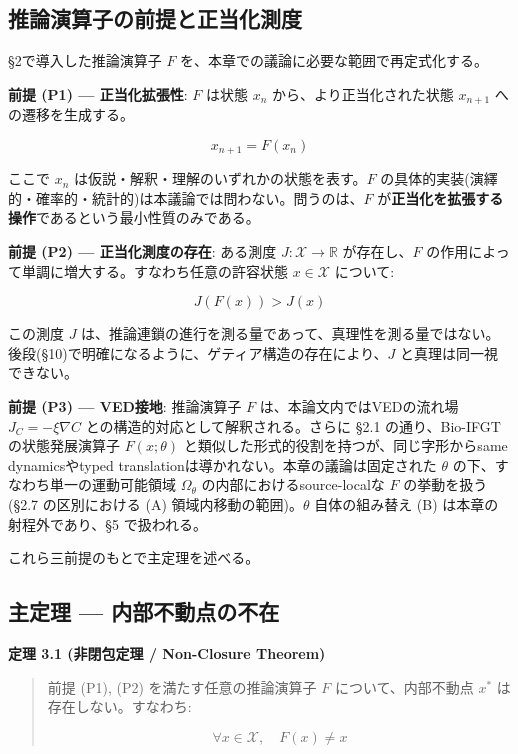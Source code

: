 \bigskip


\subsection{推論演算子の前提と正当化測度}


\S{}2で導入した推論演算子 $F$ を、本章での議論に必要な範囲で再定式化する。

\textbf{前提 (P1) — 正当化拡張性}:
$F$ は状態 $x_n$ から、より正当化された状態 $x_{n+1}$ への遷移を生成する。

\[
x_{n+1} = F(x_n)
\]

ここで $x_n$ は仮説・解釈・理解のいずれかの状態を表す。$F$ の具体的実装(演繹的・確率的・統計的)は本議論では問わない。問うのは、$F$ が\textbf{正当化を拡張する操作}であるという最小性質のみである。

\textbf{前提 (P2) — 正当化測度の存在}:
ある測度 $J: \mathcal{X} \to \mathbb{R}$ が存在し、$F$ の作用によって単調に増大する。すなわち任意の許容状態 $x \in \mathcal{X}$ について:

\[
J(F(x)) > J(x)
\]

この測度 $J$ は、推論連鎖の進行を測る量であって、真理性を測る量ではない。後段(\S{}10)で明確になるように、ゲティア構造の存在により、$J$ と真理は同一視できない。

\textbf{前提 (P3) — VED接地}:
推論演算子 $F$ は、本論文内ではVEDの流れ場 $J_C = -\xi \nabla C$ との構造的対応として解釈される。さらに \S{}2.1 の通り、Bio-IFGT の状態発展演算子 $F(x;\theta)$ と類似した形式的役割を持つが、同じ字形からsame dynamicsやtyped translationは導かれない。本章の議論は固定された $\theta$ の下、すなわち単一の運動可能領域 $\Omega_\theta$ の内部におけるsource-localな $F$ の挙動を扱う(\S{}2.7 の区別における (A) 領域内移動の範囲)。$\theta$ 自体の組み替え (B) は本章の射程外であり、\S{}5 で扱われる。

これら三前提のもとで主定理を述べる。

\bigskip


\subsection{主定理 — 内部不動点の不在}


\textbf{定理 3.1 (非閉包定理 / Non-Closure Theorem)}

\begin{quote}
前提 (P1), (P2) を満たす任意の推論演算子 $F$ について、内部不動点 $x^*$ は存在しない。すなわち:

$$
\forall x \in \mathcal{X}, \quad F(x) \neq x
$$
\end{quote}



